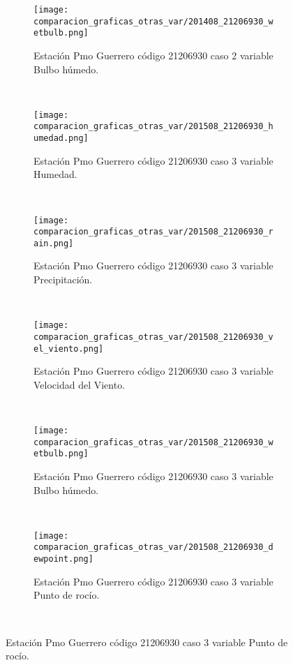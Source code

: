 \begin{figure}[H]
\centering
\begin{subfigure}[normla]{0.4\textwidth}
\caption{Estación Pmo Guerrero código 21206930 caso 2 variable Bulbo húmedo.}
\texttt{[image: comparacion\_graficas\_otras\_var/201408\_21206930\_wetbulb.png]}
\end{subfigure}
~
\begin{subfigure}[normla]{0.4\textwidth}
\caption{Estación Pmo Guerrero código 21206930 caso 3 variable Humedad.}
\texttt{[image: comparacion\_graficas\_otras\_var/201508\_21206930\_humedad.png]}
\end{subfigure}
~
\begin{subfigure}[normla]{0.4\textwidth}
\caption{Estación Pmo Guerrero código 21206930 caso 3 variable Precipitación.}
\texttt{[image: comparacion\_graficas\_otras\_var/201508\_21206930\_rain.png]}
\end{subfigure}
~
\begin{subfigure}[normla]{0.4\textwidth}
\caption{Estación Pmo Guerrero código 21206930 caso 3 variable Velocidad del Viento.}
\texttt{[image: comparacion\_graficas\_otras\_var/201508\_21206930\_vel\_viento.png]}
\end{subfigure}
~
\begin{subfigure}[normla]{0.4\textwidth}
\caption{Estación Pmo Guerrero código 21206930 caso 3 variable Bulbo húmedo.}
\texttt{[image: comparacion\_graficas\_otras\_var/201508\_21206930\_wetbulb.png]}
\end{subfigure}
~
\begin{subfigure}[normla]{0.4\textwidth}
\caption{Estación Pmo Guerrero código 21206930 caso 3 variable Punto de rocío.}
\texttt{[image: comparacion\_graficas\_otras\_var/201508\_21206930\_dewpoint.png]}
\end{subfigure}
~
\end{figure}
           
